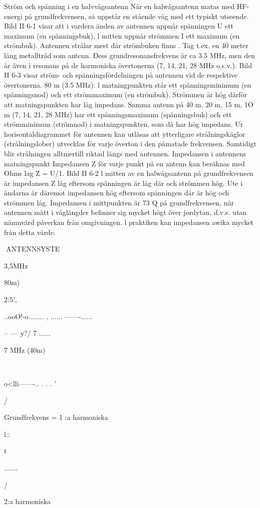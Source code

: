 \documentclass[a4paper,twoside,twocolumn,openright]{book}
\begin{document}
{{{{Ström och spänning i en halvvågsantenn
När en halwågsantenn matas med HF-energi på grundfrekvensen, så uppstår en stående våg med ett typiskt utseende.
Bild II 6-1 visar att i vardera änden av
antennen uppnår spänningen U ett maximum (en spänningsbuk), l mitten uppnår
strömmen I ett maximum (en strömbuk).
Antennen strålar mest där strömbuken finns .
Tag t.ex. en 40 meter lång metalltråd
som antenn. Dess grundresonansfrekvens
är ca 3.5 MHz, men den är även i resonans
på de harmoniska övertonerna (7, 14, 21,
28 MHz o.s.v.).
Bild II 6-3 visar ström- och spänningsfördelningen på antennen vid de respektive
övertonerna.
80 m (3.5 MHz):
l matningpunkten står ett spänningsminimum (en spänningsnod) och ett strömmaximum (en strömbuk). Strömmen är hög
därför att matningspunkten har låg impedans.
Samma antenn på 40 m, 20 m, 15 m, 1O
m (7, 14, 21, 28 MHz) har ett spänningsmaximum (spänningsbuk) och ett strömminimum (strömnod) i matningspunkten, som
då har hög impedans.
Ur horisontaldiagrammet för antennen
kan utläsas att ytterligare strålningskäglor
(strålningslober) utvecklas för varje överton
i den påmatade frekvensen. Samtidigt blir
strålningen alltmertill riktad längs med antennen.
Impedansen i antennens matningspunkt
Impedansen Z för varje punkt på en antenn
kan beräknas med Ohms lag Z = U/1.
Bild II 6-2
l mitten av en halwågsantenn på grundfrekvensen är impedansen Z låg eftersom
spänningen är låg där och strömmen hög.
Ute i ändarna är däremot impedansen hög
eftersom spänningen där är hög och strömmen låg.
Impedansen i mittpunkten är 73 Q på
grundfrekvensen, när antennen mätt i våglängder befinner sig mycket högt över jordytan, d.v.s. utan nämnvärd påverkan från
omgivningen. l praktiken kan impedansen
awika mycket från detta värde.

ANTENNSYSTE

3,5MHz {80m)

2:5',

..ooO!-o........
, ......
-------......

-- ---~y?/ 7
......

7 MHz (40m)

~

o<lli-------.. . . .
'

/

Grundfrekvens =
1 :a harmoniska

l::

t

.......

/

2:a harmoniska

}}}}}
\end{document}

